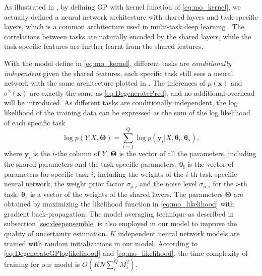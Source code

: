 As illustrated in , by defining GP with kernel function of \eqref{eq:mo_kernel}, we actually defined a neural network architecture with shared layers and task-specific layers, which is a common architecture used in multi-task deep learning \cite{ruder2017overview}. The correlations between tasks are naturally encoded by the shared layers, while the task-specific features are further learnt from the shared features.

With the model define in \eqref{eq:mo_kernel}, different tasks are \emph{conditionally independent} given the shared features, each specific task still sees a neural network with the same architecture plotted in . The inferences of $\mu(\bm{x})$ and $\sigma^2(\bm{x})$ are exactly the same as \eqref{eq:DegeneratePred}, and no additional overhead will be introduced. As different tasks are conditionally independent, the log likelihood of the training data can be expressed as the sum of the log likelihood of each specific task
\begin{equation}
    \label{eq:mo_likelihood}
    \log p(Y | X, \bm{\Theta}) = \sum_{i=1}^Q \log p(\bm{y}_i | X, \bm{\theta}_i, \bm{\theta}_s),
\end{equation}
where $\bm{y}_i$ is the $i$-the column of $Y$, $\bm{\Theta}$ is the vector of all the parameters, including the shared parameters and the task-specific parameters. $\bm{\theta_i}$ is the vector of parameters for specific task $i$, including the weights of the $i$-th task-specific neural network, the weight prior factor $\sigma_{p, i}$ and the noise level $\sigma_{n, i}$ for the $i$-th task. $\bm{\theta}_s$ is a vector of the weights of the shared layers. The parameters $\bm{\Theta}$ are obtained by maximizing the likelihood function in \eqref{eq:mo_likelihood} with gradient back-propagation. The model averaging technique as described in subsection \ref{sec:deepensemble} is also employed in our model to improve the quality of uncertainty estimation. $K$ independent neural network models are trained with random initializations in our model. According to \eqref{eq:DegenerateGPloglikelihood} and \eqref{eq:mo_likelihood}, the time complexity of training for our model is $O(KN\sum_i^Q M_i^2)$.

